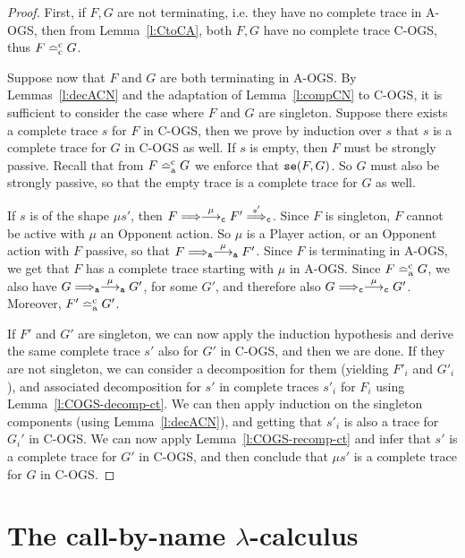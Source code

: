 \documentclass[11pt,a4paper]{amsart}
\theoremstyle{plain}
\theoremstyle{definition}
\theoremstyle{defC}
\theoremstyle{thmC}
\theoremstyle{plain}
\numberwithin{equation}{section}
\newcommand{\tr}{s}
\newcommand{\AOGS}{\mbox{{\rm A-OGS}}\xspace}      %
\newcommand{\COGS}{\mbox{{\rm C-OGS}}\xspace}      %
\newcommand{\okC}[2]{{\tt se}(#1,#2)}  %
\newcommand{\rmm}[1]{{\tt{\lowercase{#1}}}}
\newcommand{\genarr}[2]{\mathrel{\stackrel{{#1}}{\longrightarrow}_{\rmm{\lowercase{#2}}}}}
\newcommand{\genArr}[2]{\mathrel{\stackrel{{#1}}{\Longrightarrow}_{\rmm{\lowercase{#2}}}}}  %
\newcommand{\arrA}[1]{\genarr{#1}{A}}  %
\newcommand{\ArrA}[1]{\genArr{#1}{A}}  %
\newcommand{\arrC}[1]{\genarr{#1}{C}}   %
\newcommand{\ArrC}[1]{\genArr{#1}{C}}   %
\newcommand{\genTEcomp}[1]{\mathrel{\bumpeq^{\rm c}_{\rm{\lowercase{#1}}}}} %
\newcommand{\TEc}{\genTEcomp{A}}        %
\newcommand{\TEpc}{\genTEcomp{C}}        %
\newcommand{\FF}{F}
\newcommand{\GG}{G}
\newcommand{\act}{\mu}
\theoremstyle{plain}
\theoremstyle{definition}
\begin{document}
\begin{proof}
First, if $\FF,\GG$ are not terminating, i.e. they have no complete trace in \AOGS, 
then from Lemma~\ref{l:CtoCA}, both 
$\FF,\GG$ have no complete trace \COGS, thus
$\FF \TEpc \GG$. 

Suppose now that $\FF$ and $\GG$ are both terminating in \AOGS.
By Lemmas~\ref{l:decACN} and the adaptation of Lemma~\ref{l:compCN} to \COGS, it is sufficient to consider 
the case where $\FF$ and $\GG$ are singleton. 
%
Suppose there exists a complete trace $\tr$ for $\FF$ in \COGS, 
then we prove by induction over $\tr$
that $\tr$ is a complete trace for $\GG$ in \COGS as well.
If $\tr$ is empty, then $\FF$ must be strongly passive.
Recall that from $\FF \TEc \GG$ we enforce that
$\okC{\FF}{\GG}$.
So $\GG$ must also be strongly passive, so that 
the empty trace is a complete trace for $\GG$ as well.


If $\tr$ is of the shape $\act\tr'$, then
$\FF \Longrightarrow \arrC {\mu} \FF' \ArrC{\tr'}$.
Since $\FF$ is singleton, $\FF$ cannot be active with $\mu$ an Opponent action.
So $\mu$ is a Player action, or an Opponent action with $\FF$ passive,
so that $\FF \ArrA{}  \arrA {\mu} \FF'$.
Since $\FF$ is terminating in \AOGS, we get that $\FF$ has a complete trace
starting with $\mu$ in \AOGS.
Since 
$\FF  \TEc \GG$, we also have
$\GG \ArrA{} \arrA \mu \GG'$, for some $\GG'$, and therefore also 
$\GG \ArrC{} \arrC \mu \GG'$. 
Moreover, $\FF' \TEc \GG'$.

If $\FF'$ and $\GG'$ are singleton, we can now apply the induction hypothesis 
and derive the same complete trace  $\tr'$ also for $\GG'$ in \COGS, and then we are done. 
%
If they are not singleton, we can consider a decomposition for them 
(yielding $\FF'_i$ and $\GG'_i$), and associated decomposition
for $\tr'$ in complete traces $\tr'_i$ for $\FF_i$ using Lemma~\ref{l:COGS-decomp-ct}. 
We can then apply induction on the singleton components (using
Lemma~\ref{l:decACN}), and getting that
$\tr'_i$ is also a trace for $\GG_i'$ in \COGS. 
We can now apply Lemma~\ref{l:COGS-recomp-ct} 
and infer that $\tr'$ is a complete trace for $\GG'$ in \COGS,
and then conclude that $\act\tr'$ is a complete trace for $\GG$ in \COGS.
\qedhere
\end{proof} 

%

\section{The call-by-name $\lambda$-calculus}
\label{s:cbnNEW}
\end{document}
